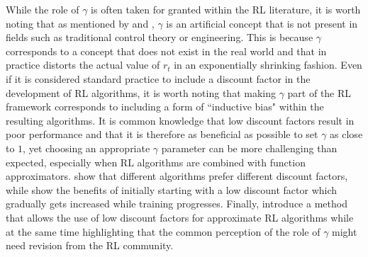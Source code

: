 While the role of $\gamma$ is often taken for granted within the RL literature, it is worth noting that as mentioned by \citet{hessel2019inductive} and \citet{schmidhuber2019reinforcement}, $\gamma$ is an artificial concept that is not present in fields such as traditional control theory or engineering. This is because $\gamma$ corresponds to a concept that does not exist in the real world and that in practice distorts the actual value of $r_t$ in an exponentially shrinking fashion. Even if it is considered standard practice to include a discount factor in the development of RL algorithms, it is worth noting that making $\gamma$ part of the RL framework corresponds to including a form of ``inductive bias" within the resulting algorithms. It is common knowledge that low discount factors result in poor performance and that it is therefore as beneficial as possible to set $\gamma$ as close to $1$, yet choosing an appropriate $\gamma$ parameter can be more challenging than expected, especially when RL algorithms are combined with function approximators. \citet{wiering2009qv} show that different algorithms prefer different discount factors, while \citet{franccois2015discount} show the benefits of initially starting with a low discount factor which gradually gets increased while training progresses. Finally, \citet{vanseijen2019using} introduce a method that allows the use of low discount factors for approximate RL algorithms while at the same time highlighting that the common perception of the role of $\gamma$ might need revision from the RL community.             

